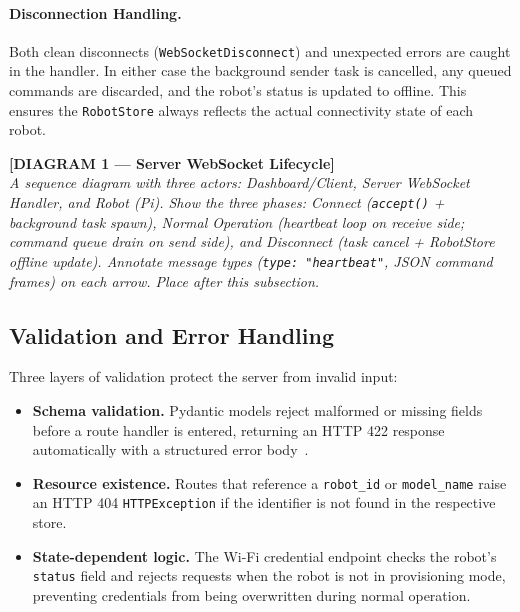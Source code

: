 \paragraph{Disconnection Handling.}
Both clean disconnects (\texttt{WebSocketDisconnect}) and unexpected
errors are caught in the handler. In either case the background
sender task is cancelled, any queued commands are discarded, and the
robot's status is updated to offline. This ensures the \texttt{RobotStore}
always reflects the actual connectivity state of each robot.

\bigskip
\noindent\textbf{[DIAGRAM 1 — Server WebSocket Lifecycle]}\\
\textit{A sequence diagram with three actors: Dashboard/Client,
	Server WebSocket Handler, and Robot (Pi). Show the three phases:
	Connect (\texttt{accept()} + background task spawn), Normal Operation
	(heartbeat loop on receive side; command queue drain on send side),
	and Disconnect (task cancel + RobotStore offline update). Annotate
	message types (\texttt{type: "heartbeat"}, JSON command frames) on
	each arrow. Place after this subsection.}
\bigskip

\subsection{Validation and Error Handling}
\label{sec:server_validation}

Three layers of validation protect the server from invalid input:

\begin{itemize}
	\item \textbf{Schema validation.} Pydantic models reject
	malformed or missing fields before a route handler is
	entered, returning an HTTP 422 response automatically with
	a structured error body~\cite{pydantic2024}.
	
	\item \textbf{Resource existence.} Routes that reference a
	\texttt{robot\_id} or \texttt{model\_name} raise an
	HTTP 404 \texttt{HTTPException} if the identifier is not
	found in the respective store.
	
	\item \textbf{State-dependent logic.} The Wi-Fi credential
	endpoint checks the robot's \texttt{status} field and
	rejects requests when the robot is not in provisioning
	mode, preventing credentials from being overwritten during
	normal operation.
\end{itemize}

